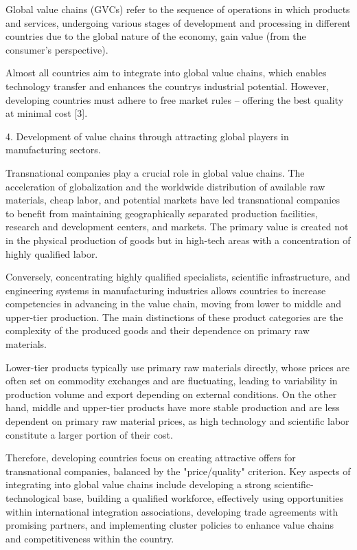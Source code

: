 Global value chains (GVCs) refer to the sequence of operations in which
products and services, undergoing various stages of development and
processing in different countries due to the global nature of the
economy, gain value (from the consumer's perspective).

Almost all countries aim to integrate into global value chains, which
enables technology transfer and enhances the country\textquotesingle s
industrial potential. However, developing countries must adhere to free
market rules -- offering the best quality at minimal cost {[}3{]}.

4. Development of value chains through attracting global players in
manufacturing sectors.

Transnational companies play a crucial role in global value chains. The
acceleration of globalization and the worldwide distribution of
available raw materials, cheap labor, and potential markets have led
transnational companies to benefit from maintaining geographically
separated production facilities, research and development centers, and
markets. The primary value is created not in the physical production of
goods but in high-tech areas with a concentration of highly qualified
labor.

Conversely, concentrating highly qualified specialists, scientific
infrastructure, and engineering systems in manufacturing industries
allows countries to increase competencies in advancing in the value
chain, moving from lower to middle and upper-tier production. The main
distinctions of these product categories are the complexity of the
produced goods and their dependence on primary raw materials.

Lower-tier products typically use primary raw materials directly, whose
prices are often set on commodity exchanges and are fluctuating, leading
to variability in production volume and export depending on external
conditions. On the other hand, middle and upper-tier products have more
stable production and are less dependent on primary raw material prices,
as high technology and scientific labor constitute a larger portion of
their cost.

Therefore, developing countries focus on creating attractive offers for
transnational companies, balanced by the "price/quality" criterion. Key
aspects of integrating into global value chains include developing a
strong scientific-technological base, building a qualified workforce,
effectively using opportunities within international integration
associations, developing trade agreements with promising partners, and
implementing cluster policies to enhance value chains and
competitiveness within the country.

